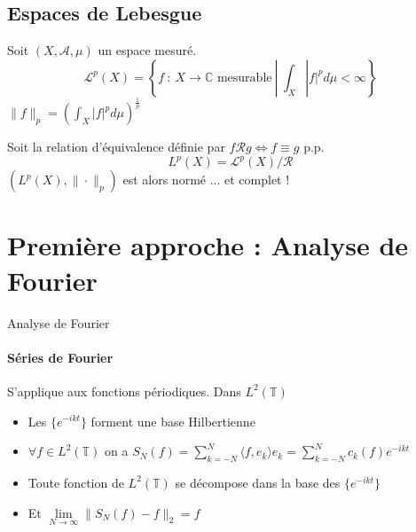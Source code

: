 \documentclass[french]{beamer}
\begin{document}
\subsection{Espaces de Lebesgue}

\begin{frame}
	Soit $(X, \mathcal{A}, \mu)$ un espace mesuré.\\
	\pause
	$$\mathcal{L}^p(X) = \left\{f ~: ~ X \to \mathbb{C} \text{ mesurable} ~ | ~ \int_X |f|^p d\mu < \infty \right\}$$
	\pause
	$\|f\|_p = \left(\displaystyle \int_X |f|^p d\mu \right)^{\frac{1}{p}}$
\end{frame}

\begin{frame}
		Soit la relation d'équivalence définie par $f \mathcal{R} g \Longleftrightarrow f \equiv g$ p.p.
		\pause
		$$L^p(X) = \mathcal{L}^p(X)/\mathcal{R}$$
		\pause
		$(L^p(X), \|\cdot\|_p)$ est alors normé ... \pause et complet !
\end{frame}




\section{Première approche : Analyse de Fourier}
\begin{frame}{Analyse de Fourier}
	\framesubtitle{Séries de Fourier}
	
	S'applique aux fonctions périodiques. 
	Dans $L^2(\mathbb{T})$
	\begin{itemize}
		\item<1-> Les $\{e^{-ikt}\}$ forment une base Hilbertienne
		\item<2-> $ \forall f \in L^2(\mathbb{T})$ on a $ S_N(f)= \sum_{k = -N}^N \langle f, e_k \rangle e_k = 
		\sum_{k = -N}^N c_k(f) e^{-ikt}  $ 
		\item<3-> Toute fonction de $L^2(\mathbb{T})$ se décompose dans la base des $\{e^{-ikt}\}$
		\item<4-> Et $ \lim\limits_{N \to \infty} \| S_N(f) - f \|_2  = f $ 
		
	\end{itemize}
	
\end{frame}
\end{document}
